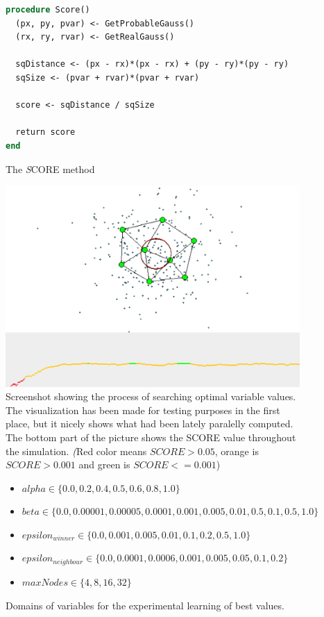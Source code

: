 \begin{figure}
\begin{lstlisting}[language=Pascal]
procedure Score()
  (px, py, pvar) <- GetProbableGauss()
  (rx, ry, rvar) <- GetRealGauss()
  
  sqDistance <- (px - rx)*(px - rx) + (py - ry)*(py - ry)
  sqSize <- (pvar + rvar)*(pvar + rvar)
  
  score <- sqDistance / sqSize
  
  return score
end
\end{lstlisting}       
\caption{The {\emph SCORE} method}
\label{usedalgo:scoremethod}
\end{figure}
       
\begin{figure}      
\begin{center}
\includegraphics[scale=0.75]{images/gng/experimental_setup.eps}    
\caption{Screenshot showing the process of searching optimal variable values. The visualization has been made for testing purposes in the first place, but it nicely shows what had been lately paralelly computed. The bottom part of the picture shows the SCORE value throughout the simulation. {\emph (Red color means $SCORE > 0.05$, orange is $SCORE > 0.001$ and green is $SCORE <= 0.001$)} }
\end{center}                          
\label{usedalgo:gngexperimentscreen}
\end{figure}

\begin{figure}          
\begin{itemize}
\item $alpha \in \{0.0, 0.2, 0.4, 0.5, 0.6, 0.8, 1.0\}$
\item $beta \in \{0.0, 0.00001, 0.00005, 0.0001, 0.001, 0.005, 0.01, 0.5, 0.1, 0.5, 1.0\}$
\item $epsilon_{winner} \in \{0.0, 0.001, 0.005, 0.01, 0.1, 0.2, 0.5, 1.0\}$
\item $epsilon_{neighbour} \in \{0.0, 0.0001, 0.0006, 0.001, 0.005, 0.05, 0.1, 0.2\}$
\item $maxNodes \in \{4, 8, 16, 32\}$
\end{itemize}
\caption{Domains of variables for the experimental learning of best values.}
\label{usedalgo:gngexperimentdomains}
\end{figure}

